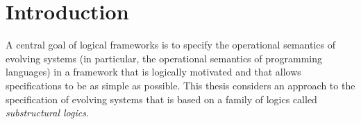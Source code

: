 \chapter{Introduction}
\label{chapter-introduction}







A central goal of logical frameworks is to specify the operational
semantics of evolving systems (in particular, the operational
semantics of programming languages) in a framework that is logically
motivated and that allows specifications to be as simple as possible.
This thesis considers an approach to the specification of evolving
systems that is based on a family of logics called {\it substructural
  logics}.

